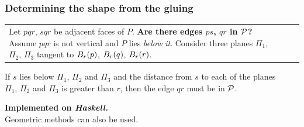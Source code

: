 
\begin{frame}
\frametitle{Determining the shape from the gluing}

\begin{tabular}{lll}
\makecell[l]{
	Let $pqr$, $sqr$ be adjacent faces of $P$. \\
	\textcolor{hard}{\bf Are there edges $ps$, $qr$ in $\P$?} \bigskip \\
	Assume $pqr$ is not vertical and $P$ lies {\itshape below it}. \\
	Consider three planes $\Pi_1$, $\Pi_2$, $\Pi_3$ tangent \\
	to $\ball{p}$, $\ball{q}$, $\ball{r}$.
}
& \hspace{0.47cm} & \hspace{-3.2cm}
	\def\scopescale{0.51}
	\makecell[c]{}
\end{tabular}

\begin{theorem}
	If $s$ lies below $\Pi_1$, $\Pi_2$ and $\Pi_3$ and the distance from $s$ to each of the planes \\
	$\Pi_1$, $\Pi_2$ and $\Pi_3$ is greater than $r$, then the edge $qr$ must be in $\P$.
\end{theorem} \medskip

\textcolor{hard}{\bf Implemented on {\itshape Haskell.}} \\
Geometric methods can also be used.
\vspace{2mm}
\end{frame}